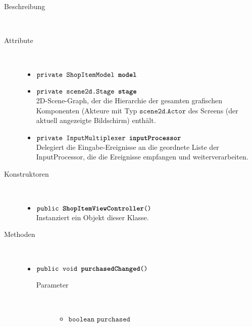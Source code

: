 \begin{description}
\item[Beschreibung] \hfill \\ 
\item[Attribute] \hfill \\
	\vspace{-.8cm}
	\begin{itemize}	
		\item $\texttt{private ShopItemModel \textbf{model}}$ \\ 
		\item $\texttt{private scene2d.Stage \textbf{stage}}$ \\ 2D-Scene-Graph, der die Hierarchie der gesamten grafischen Komponenten (Akteure mit Typ $\texttt{scene2d.Actor}$ des Screens (der aktuell angezeigte Bildschirm) enthält. 
		\item $\texttt{private InputMultiplexer \textbf{inputProcessor}}$ \\ Delegiert die Eingabe-Ereignisse an die geordnete Liste der InputProcessor, die die Ereignisse empfangen und weiterverarbeiten.
		\end{itemize}
	
\item[Konstruktoren] \hfill \\
	\vspace{-.8cm}
	\begin{itemize}
		\item $\texttt{public \textbf{ShopItemViewController}()}$ \\ Instanziert ein Objekt dieser Klasse.

	\end{itemize}
	
\item[Methoden] \hfill \\
	\vspace{-.8cm}
	\begin{itemize}
		\item $\texttt{public void \textbf{purchasedChanged}()}$ \\ 
			\begin{description}
			\item[Parameter] \hfill \\
			\vspace{-.8cm}
			\begin{itemize}
				\item $\texttt{boolean purchased}$ \\ 
			\end{itemize}
			\end{description}
		

\end{itemize}
\end{description}
